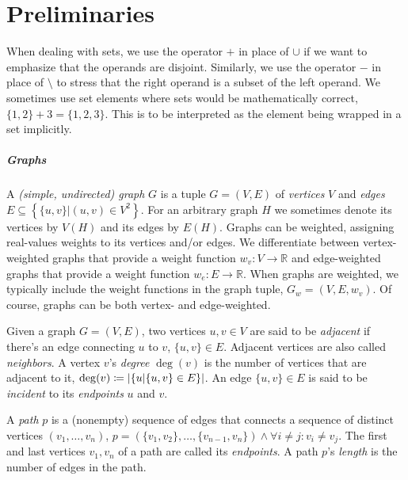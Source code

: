 \chapter{Preliminaries}
\label{chap:preliminaries}



When dealing with sets, we use the operator $+$ in place of $\cup$ if we want to emphasize that the operands are disjoint.
Similarly, we use the operator $-$ in place of $\setminus$ to stress that the right operand is a subset of the left operand.
We sometimes use set elements where sets would be mathematically correct, \eg{} $\{1,2\} + 3 = \{1,2,3\}$.
This is to be interpreted as the element being wrapped in a set implicitly.


\paragraph{Graphs}

A \emph{(simple, undirected) graph} $G$ is a tuple $G = (V, E)$ of \emph{vertices} $V$ and \emph{edges} $E \subseteq \left\{\{u,v\} \vert (u,v) \in V^2 \right\}$.
For an arbitrary graph $H$ we sometimes denote its vertices by $V(H)$ and its edges by $E(H)$.
Graphs can be weighted, assigning real-values weights to its vertices and/or edges.
We differentiate between vertex-weighted graphs that provide a weight function $w_v \colon V \to \mathbb{R}$ and edge-weighted graphs that provide a weight function $w_e \colon E \to \mathbb{R}$.
When graphs are weighted, we typically include the weight functions in the graph tuple, \eg{} $G_w = (V,E,w_v)$.
Of course, graphs can be both vertex- and edge-weighted.

Given a graph $G = (V, E)$, two vertices $u, v \in V$ are said to be \emph{adjacent} if there's an edge connecting $u$ to $v$, \ie{} $\{u, v\} \in E$.
Adjacent vertices are also called \emph{neighbors}.
A vertex $v$'s \emph{degree} $\deg(v)$ is the number of vertices that are adjacent to it, \ie{} $\deg(v) \coloneqq \left\lvert\{u \vert \{u,v\} \in E\}\right\rvert$.
An edge $\{u, v\} \in E$ is said to be \emph{incident} to its \emph{endpoints} $u$ and $v$.

A \emph{path} $p$ is a (nonempty) sequence of edges that connects a sequence of distinct vertices $(v_1, \dots, v_n)$, \ie{} $p = (\{v_1, v_2\}, \dots, \{v_{n-1},v_n\}) \land \forall i \neq j \colon v_i \neq v_j$.
The first and last vertices $v_1, v_n$ of a path are called its \emph{endpoints}.
A path $p$'s \emph{length} is the number of edges in the path.

